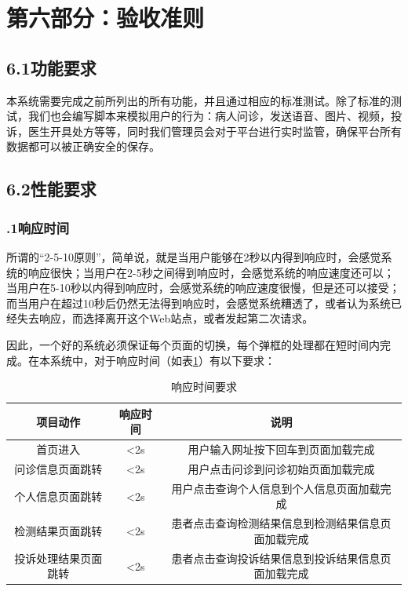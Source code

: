 \documentclass[24pt,a4paper]{article}%
\begin{document}
\section*{\songti 第六部分：验收准则}
\subsection*{\songti 6.1功能要求}

本系统需要完成之前所列出的所有功能，并且通过相应的标准测试。除了标准的测试，我们也会编写脚本来模拟用户的行为：病人问诊，发送语音、图片、视频，投诉，医生开具处方等等，同时我们管理员会对于平台进行实时监管，确保平台所有数据都可以被正确安全的保存。

\subsection*{\songti 6.2性能要求}
\subsubsection*{.1响应时间}

所谓的“2-5-10原则”，简单说，就是当用户能够在2秒以内得到响应时，会感觉系统的响应很快；当用户在2-5秒之间得到响应时，会感觉系统的响应速度还可以；当用户在5-10秒以内得到响应时，会感觉系统的响应速度很慢，但是还可以接受；而当用户在超过10秒后仍然无法得到响应时，会感觉系统糟透了，或者认为系统已经失去响应，而选择离开这个Web站点，或者发起第二次请求。

因此，一个好的系统必须保证每个页面的切换，每个弹框的处理都在短时间内完成。在本系统中，对于响应时间（如表\ref*{response-time}）有以下要求：
\begin{table}[htpb]
	\centering
	\caption{响应时间要求}
	\label{response-time}
	\begin{tabular}{|c|c|c|}
		\hline
		项目动作 & 响应时间 & 说明\\ \hline
		首页进入 & <2s & 用户输入网址按下回车到页面加载完成\\ \hline
		问诊信息页面跳转 & <2s & 用户点击问诊到问诊初始页面加载完成\\ \hline
		个人信息页面跳转 & <2s & 用户点击查询个人信息到个人信息页面加载完成\\ \hline
		检测结果页面跳转 & <2s & 患者点击查询检测结果信息到检测结果信息页面加载完成\\ \hline
		投诉处理结果页面跳转 & <2s & 患者点击查询投诉结果信息到投诉结果信息页面加载完成\\ \hline
	\end{tabular}
\end{table}
\end{document}
